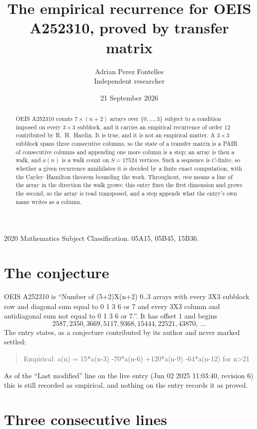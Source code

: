 \documentclass[11pt,a4paper]{article}
\title{The empirical recurrence for OEIS A252310, proved by transfer matrix}
\author{Adrian Perez Fontelles\\ \small Independent researcher}
\date{21 September 2026}
\theoremstyle{plain}
\theoremstyle{definition}
\begin{document}
\maketitle

\begin{abstract}
OEIS A252310 counts $7\times(n+2)$ arrays over $\{0,\dots,3\}$ subject to a condition imposed on
every $3\times3$ subblock, and it carries an empirical recurrence of order $12$
contributed by R.~H.~Hardin. It is true, and it is not an empirical matter. A $3\times3$
subblock spans three consecutive columns, so the state of a transfer matrix is a PAIR of
consecutive columns and appending one more column is a step; an array is then a walk, and
$a(n)$ is a walk count on $S=17524$ vertices. Such a sequence is $C$-finite, so whether a given
recurrence annihilates it is decided by a finite exact computation, with the Cayley--Hamilton
theorem bounding the work.
 Throughout, \emph{row} means a line of the array in the direction the walk grows: this entry fixes the first dimension and grows the second, so the array is read transposed, and a step appends what the entry's own name writes as a column.\end{abstract}

\noindent\small 2020 Mathematics Subject Classification. 05A15, 05B45, 15B36.\normalsize

\section{The conjecture}

OEIS A252310 is ``Number of (5+2)X(n+2) 0..3 arrays with every 3X3 subblock row and diagonal sum equal to 0 1 3 6 or 7 and every 3X3 column and antidiagonal sum not equal to 0 1 3 6 or 7.''. It has offset $1$ and begins
\[
2587, 2350, 3669, 5117, 9368, 15444, 22521, 43870,\ \dots
\]
The entry states, as a conjecture contributed by its author and never marked settled:
\begin{quote}
Empirical: a(n) = 15*a(n-3) -70*a(n-6) +120*a(n-9) -64*a(n-12) for n>21
\end{quote}
As of the ``Last modified'' line on the live entry (Jun 02 2025 11:03:40, revision 6) this is still
recorded as empirical, and nothing on the entry records it as proved.

\section{Three consecutive lines}
\end{document}
